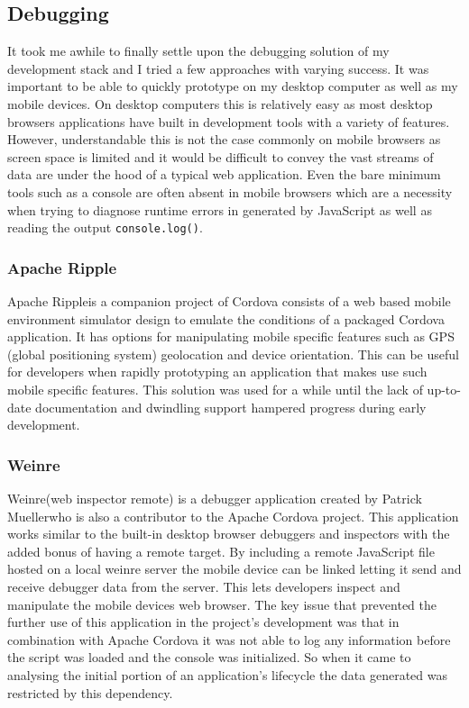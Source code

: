 \documentclass[final]{cmpreport}
\begin{document}

\subsection{Debugging}
It took me awhile to finally settle upon the debugging solution of my development stack and I tried a few approaches with varying success. It was important to be able to quickly prototype on my desktop computer as well as my mobile devices. On desktop computers this is relatively easy as most desktop browsers applications have built in development tools with a variety of features. However, understandable this is not the case commonly on mobile browsers as screen space is limited and it would be difficult to convey the vast streams of data are under the hood of a typical web application. Even the bare minimum tools such as a console are often absent in mobile browsers which are a necessity when trying to diagnose runtime errors in generated by JavaScript as well as reading the output \texttt{console.log()}.

\subsubsection{Apache Ripple}
Apache Ripple\footnotemark is a companion project of Cordova consists of a web based mobile environment simulator design to emulate the conditions of a packaged Cordova application. It has options for manipulating mobile specific features such as GPS (global positioning system) geolocation and device orientation. This can be useful for developers when rapidly prototyping an application that makes use such mobile specific features. This solution was used for a while until the lack of up-to-date documentation and dwindling support hampered progress during early development.


\subsubsection{Weinre}
Weinre\footnotemark (web inspector remote) is a debugger application created by Patrick Mueller\footnotemark who is also a contributor to the Apache Cordova project. This application works similar to the built-in desktop browser debuggers and inspectors with the added bonus of having a remote target. By including a remote JavaScript file hosted on a local weinre server the mobile device can be linked letting it send and receive debugger data from the server. This lets developers inspect and manipulate the mobile devices web browser. The key issue that prevented the further use of this application in the project's development was that in combination with Apache Cordova it was not able to log any information before the script was loaded and the console was initialized. So when it came to analysing the initial portion of an application's lifecycle the data generated was restricted by this dependency.
\end{document}
